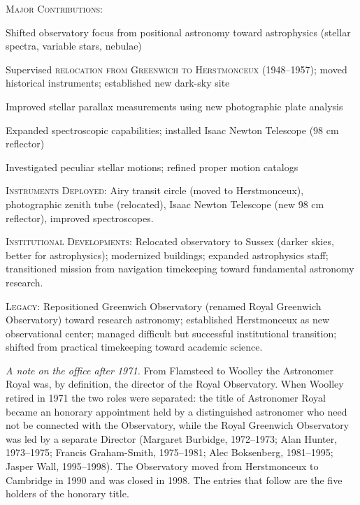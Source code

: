 \noindent\textsc{Major Contributions}:
\begin{enumerate*}[label=(\arabic*)]
\item Shifted observatory focus from positional astronomy toward astrophysics (stellar spectra, variable stars, nebulae)
\item Supervised \textsc{relocation from Greenwich to Herstmonceux} (1948--1957); moved historical instruments; established new dark-sky site
\item Improved stellar parallax measurements using new photographic plate analysis
\item Expanded spectroscopic capabilities; installed Isaac Newton Telescope (98 cm reflector)
\item Investigated peculiar stellar motions; refined proper motion catalogs
\end{enumerate*}

\noindent\textsc{Instruments Deployed}: Airy transit circle (moved to Herstmonceux), photographic zenith tube (relocated), Isaac Newton Telescope (new 98 cm reflector), improved spectroscopes.

\noindent\textsc{Institutional Developments}: Relocated observatory to Sussex (darker skies, better for astrophysics); modernized buildings; expanded astrophysics staff; transitioned mission from navigation timekeeping toward fundamental astronomy research.

\noindent\textsc{Legacy}: Repositioned Greenwich Observatory (renamed Royal Greenwich Observatory) toward research astronomy; established Herstmonceux as new observational center; managed difficult but successful institutional transition; shifted from practical timekeeping toward academic science.

\medskip

\medskip
\noindent\textit{A note on the office after 1971.} From Flamsteed to Woolley the Astronomer Royal was, by definition, the director of the Royal Observatory. When Woolley retired in 1971 the two roles were separated: the title of Astronomer Royal became an honorary appointment held by a distinguished astronomer who need not be connected with the Observatory, while the Royal Greenwich Observatory was led by a separate Director (Margaret Burbidge, 1972--1973; Alan Hunter, 1973--1975; Francis Graham-Smith, 1975--1981; Alec Boksenberg, 1981--1995; Jasper Wall, 1995--1998). The Observatory moved from Herstmonceux to Cambridge in 1990 and was closed in 1998. The entries that follow are the five holders of the honorary title.
\medskip

